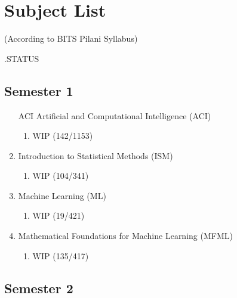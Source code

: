 \chapter*{Subject List}

\begin{center}
(According to BITS Pilani Syllabus)
\end{center}

.\hfill STATUS

\section*{Semester 1}
\begin{enumerate}
    \item[ACI] Artificial and Computational Intelligence (ACI)
        \begin{enumerate}
            \item {} 
            \hfill WIP (142/1153)
        \end{enumerate}

    \item Introduction to Statistical Methods (ISM)    
        \begin{enumerate}
            \item {} 
            \hfill WIP (104/341)
        \end{enumerate}

    \item Machine Learning (ML)
        \begin{enumerate}
            \item {} 
            \hfill WIP (19/421)
        \end{enumerate}
        
    \item Mathematical Foundations for Machine Learning (MFML)
        \begin{enumerate}
            \item {}
            \hfill WIP (135/417)
        \end{enumerate}
\end{enumerate}


\section*{Semester 2}

